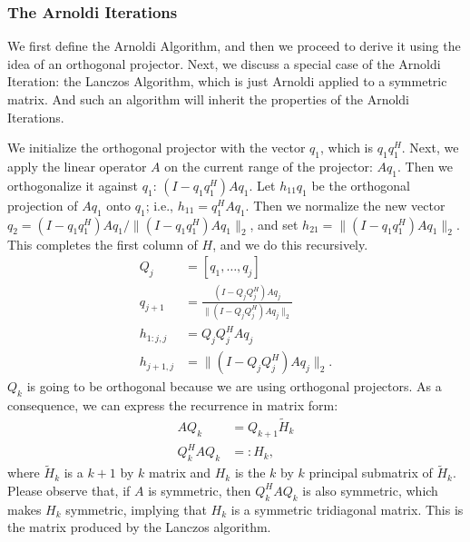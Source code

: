 \documentclass[]{article}
\theoremstyle{definition}
\begin{document}
        \subsubsection{The Arnoldi Iterations}
            We first define the Arnoldi Algorithm, and then we proceed to derive it using the idea of an orthogonal projector. Next, we discuss a special case of the Arnoldi Iteration: the Lanczos Algorithm, which is just Arnoldi applied to a symmetric matrix. And such an algorithm will inherit the properties of the Arnoldi Iterations. 
            \par
            We initialize the orthogonal projector with the vector $q_1$, which is $q_1q_1^H$.  Next, we apply the linear operator $A$ on the current range of the projector: $Aq_1$.  Then we orthogonalize it against $q_1$:  $(I - q_1 q_1^H ) A q_1$.  Let $h_{11} q_1$ be the orthogonal projection of $A q_1$ onto $q_1$; i.e., $h_{11} = q_1^H A q_1$.  Then we normalize the new vector $q_2 = (I - q_1 q_1^H ) A q_1 / \| (I - q_1 q_1^H ) A q_1 \|_2$, and set
            $h_{21} = \| (I - q_1 q_1^H ) A q_1 \|_2$.  
            This completes the first column of $H$, and we do this recursively. 
            \begin{align}
                Q_j &= [ q_1 , \ldots , q_j ]
                \\
                q_{ j + 1} &= \frac{(I - Q_j Q_j^H)Aq_j}{\| (I - Q_j Q_j^H ) A q_j \|_2}
                \\
                h_{1:j, j} &= Q_j Q_j^H Aq_j 
                \\
                h_{j+1,j} &= \| (I - Q_j Q_j^H ) A q_j \|_2 .
            \end{align}
            $Q_k$ is going to be orthogonal because we are using orthogonal projectors. As a consequence, we can express the recurrence in matrix form: 
            \begin{align}
                AQ_{k} &= Q_{k + 1}\tilde{H}_k
                \\
                Q_{k}^HAQ_{k} &=: H_k ,
            \end{align}
            where $\tilde{H}_k$ is a $k+1$ by $k$ matrix and  $H_k$ is the $k$ by $k$ principal submatrix of $\tilde{H}_k$. Please observe that, if $A$ is symmetric, then $Q^H_kAQ_k$ is also symmetric, which makes $H_k$ symmetric, implying that $H_k$ is a symmetric tridiagonal matrix.  This is the matrix produced by the Lanczos algorithm.
\end{document}
